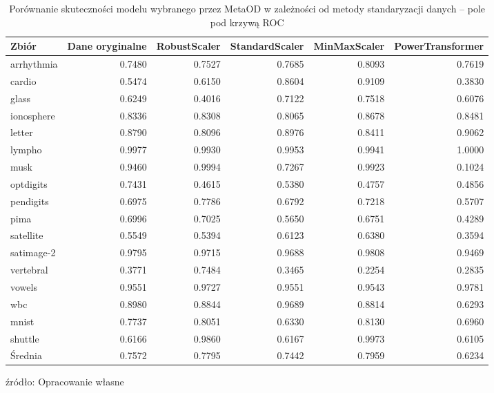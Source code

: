 \begin{sidewaystable}
    \centering
\begin{tabular}{lrrrrr}
      Zbiór & Dane oryginalne & RobustScaler & StandardScaler & MinMaxScaler & PowerTransformer \\ \hline
arrhythmia &               0.7480 &                  0.7527 &            0.7685 &      0.8093 &      0.7619 \\
    cardio &               0.5474 &                  0.6150 &            0.8604 &      0.9109 &      0.3830 \\
     glass &               0.6249 &                  0.4016 &            0.7122 &      0.7518 &      0.6076 \\
ionosphere &               0.8336 &                  0.8308 &            0.8065 &      0.8678 &      0.8481 \\
    letter &               0.8790 &                  0.8096 &            0.8976 &      0.8411 &      0.9062 \\
    lympho &               0.9977 &                  0.9930 &            0.9953 &      0.9941 &      1.0000 \\
      musk &               0.9460 &                  0.9994 &            0.7267 &      0.9923 &      0.1024 \\
 optdigits &               0.7431 &                  0.4615 &            0.5380 &      0.4757 &      0.4856 \\
 pendigits &               0.6975 &                  0.7786 &            0.6792 &      0.7218 &      0.5707 \\
      pima &               0.6996 &                  0.7025 &            0.5650 &      0.6751 &      0.4289 \\
 satellite &               0.5549 &                  0.5394 &            0.6123 &      0.6380 &      0.3594 \\
satimage-2 &               0.9795 &                  0.9715 &            0.9688 &      0.9808 &      0.9469 \\
 vertebral &               0.3771 &                  0.7484 &            0.3465 &      0.2254 &      0.2835 \\
    vowels &               0.9551 &                  0.9727 &            0.9551 &      0.9543 &      0.9781 \\
       wbc &               0.8980 &                  0.8844 &            0.9689 &      0.8814 &      0.6293 \\
     mnist &               0.7737 &                  0.8051 &            0.6330 &      0.8130 &      0.6960 \\
   shuttle &               0.6166 &                  0.9860 &            0.6167 &      0.9973 &      0.6105 \\
\hline
Średnia &0.7572&
0.7795&
0.7442&
0.7959&
0.6234
\end{tabular}
    \caption{Porównanie skuteczności modelu wybranego przez MetaOD w zależności od metody standaryzacji danych -- pole pod krzywą ROC}
    \footnotesize{źródło: Opracowanie własne}
    \label{tab:roc_sc}

\end{sidewaystable}
